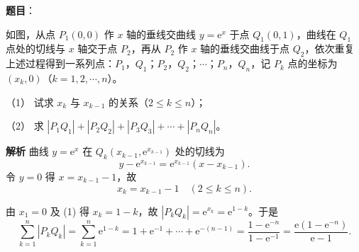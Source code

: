 \begin{answer}

\textbf{题目}：

如图，从点 $P_1(0,0)$ 作 $x$ 轴的垂线交曲线 $y=\mathrm e^x$ 于点 $Q_1(0,1)$，曲线在 $Q_1$ 点处的切线与 $x$ 轴交于点 $P_2$，再从 $P_2$ 作 $x$ 轴的垂线交曲线于点 $Q_2$，依次重复上述过程得到一系列点：$P_1$，$Q_1$；$P_2$，$Q_2$；$\cdots$；$P_n$，$Q_n$，记 $P_k$ 点的坐标为 $(x_k,0)$（$k=1,2,\cdots,n$）。

（1） 试求 $x_k$ 与 $x_{k-1}$ 的关系（$2\leqslant k\leqslant n$）；

（2） 求 $|P_1Q_1|+|P_2Q_2|+|P_3Q_3|+\cdots+|P_nQ_n|$。
\nopagebreak[4]
\begin{center}\end{center}
\nopagebreak[4]
\textbf{解析}
曲线 $y=\mathrm e^x$ 在 $Q_k\left(x_{k-1},\mathrm e^{x_{k-1}}\right)$ 处的切线为
\nopagebreak[4]
\[y-\mathrm e^{x_{k-1}}=\mathrm e^{x_{k-1}}\left(x-x_{k-1}\right).\]
令 $y=0$ 得 $x=x_{k-1}-1$，故
\nopagebreak[4]
\[x_k=x_{k-1}-1\quad(2\leqslant k\leqslant n).\]

由 $x_1=0$ 及 (1) 得 $x_k=1-k$，故 $|P_kQ_k|=\mathrm e^{x_k}=\mathrm e^{1-k}$。于是
\nopagebreak[4]
\[\sum_{k=1}^n|P_kQ_k|=\sum_{k=1}^n\mathrm e^{1-k}=1+\mathrm e^{-1}+\cdots+\mathrm e^{-(n-1)}=\frac{1-\mathrm e^{-n}}{1-\mathrm e^{-1}}=\frac{\mathrm e\left(1-\mathrm e^{-n}\right)}{\mathrm e-1}.\]



\end{answer}
